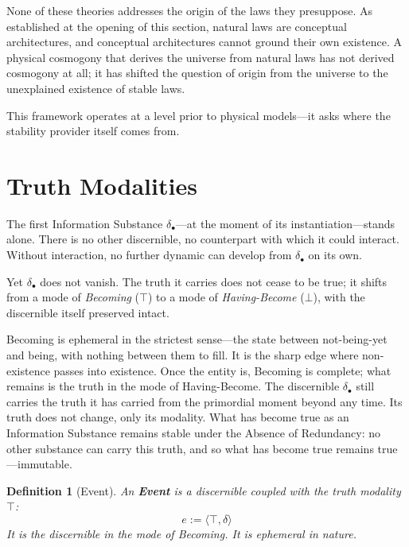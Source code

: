\documentclass[11pt, a4paper]{article}
\theoremstyle{formalism}
\newtheorem{formalism}{Definition}
\begin{document}
None of these theories addresses the origin of the laws they presuppose. As
established at the opening of this section, natural laws are conceptual
architectures, and conceptual architectures cannot ground their own
existence. A physical cosmogony that derives the universe from natural laws
has not derived cosmogony at all; it has shifted the question of origin from
the universe to the unexplained existence of stable laws.

This framework operates at a level prior to physical models---it asks where
the stability provider itself comes from. 

\section{Truth Modalities}

The first Information Substance $\delta_\bullet$---at the moment of its
instantiation---stands alone. There is no other discernible, no counterpart
with which it could interact. Without interaction, no further dynamic can
develop from $\delta_\bullet$ on its own.

Yet $\delta_\bullet$ does not vanish. The truth it carries does not cease to be
true; it shifts from a mode of \textit{Becoming} ($\top$) to a mode of
\textit{Having-Become} ($\bot$), with the discernible itself preserved
intact.

Becoming is ephemeral in the strictest sense---the state between
not-being-yet and being, with nothing between them to fill. It is the sharp
edge where non-existence passes into existence. Once the entity is, Becoming
is complete; what remains is the truth in the mode of Having-Become. The
discernible $\delta_\bullet$ still carries the truth it has carried from the
primordial moment beyond any time. Its truth does not change, only its
modality. What has become true as an Information Substance remains stable
under the Absence of Redundancy: no other substance can carry this truth,
and so what has become true remains true---immutable.

\begin{formalism}[Event]
    An \textbf{Event} is a discernible coupled with the truth modality
    $\top$:
    \begin{equation}
        e := \langle \top, \delta \rangle
    \end{equation}
    It is the discernible in the mode of \textit{Becoming}. It is
    \textit{ephemeral} in nature.
\end{formalism}
\end{document}
